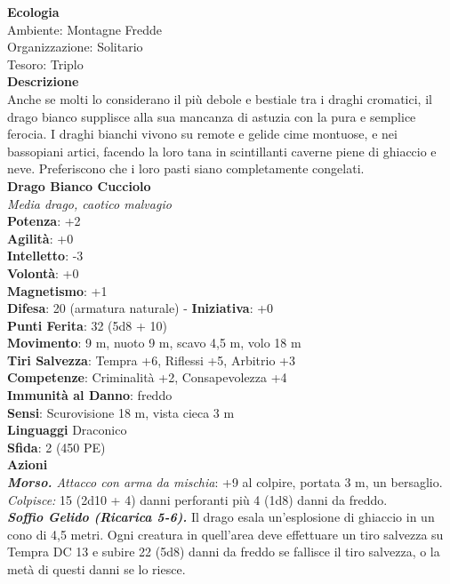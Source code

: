 \begin{multicols}{2}
\textbf{Ecologia}\\
Ambiente: Montagne Fredde\\
Organizzazione: Solitario\\
Tesoro: Triplo\\
\textbf{Descrizione}\\
Anche se molti lo considerano il più debole e bestiale tra i draghi cromatici, il drago bianco supplisce alla sua mancanza di astuzia con la pura e semplice ferocia. I draghi bianchi vivono su remote e gelide cime montuose, e nei bassopiani artici, facendo la loro tana in scintillanti caverne piene di ghiaccio e neve. Preferiscono che i loro pasti siano completamente congelati.\\


\medskip\textbf{Drago Bianco Cucciolo}\\
\emph{Media drago, caotico malvagio}\\
\textbf{Potenza}: +2\\
\textbf{Agilità}: +0\\
\textbf{Intelletto}: -3\\
\textbf{Volontà}: +0\\
\textbf{Magnetismo}: +1\\
\textbf{Difesa}: 20 (armatura naturale) - \textbf{Iniziativa}: +0\\
\textbf{Punti Ferita}: 32 (5d8 + 10)\\
\textbf{Movimento}: 9 m, nuoto 9 m, scavo 4,5 m, volo 18 m\\
\textbf{Tiri Salvezza}: Tempra +6, Riflessi +5, Arbitrio +3\\
\textbf{Competenze}: Criminalità +2, Consapevolezza +4\\
\textbf{Immunità al Danno}: freddo\\
\textbf{Sensi}: Scurovisione 18 m, vista cieca 3 m\\
\textbf{Linguaggi} Draconico\\
\textbf{Sfida}: 2 (450 PE)\smallskip\\
\smallskip\textbf{Azioni}\\
\emph{\textbf{Morso.} Attacco con arma da mischia}: +9 al colpire, portata 3 m, un bersaglio.\\
\emph{Colpisce:} 15 (2d10 + 4) danni perforanti più 4 (1d8) danni da freddo.\\
\emph{\textbf{Soffio Gelido (Ricarica 5-6).}} Il drago esala un'esplosione di ghiaccio in un cono di 4,5 metri. Ogni creatura in quell'area deve effettuare un tiro salvezza su Tempra DC  13 e subire 22 (5d8) danni da freddo se fallisce il tiro salvezza, o la metà di questi danni se lo riesce.

\end{multicols}
